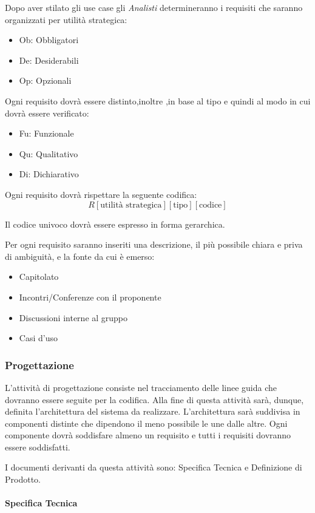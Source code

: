 Dopo aver stilato gli use case gli  \emph{Analisti}  determineranno i
requisiti che saranno organizzati per utilità strategica:
\begin{itemize}
\item Ob: Obbligatori
\item De: Desiderabili
\item Op: Opzionali
\end{itemize}
Ogni requisito dovrà essere distinto,inoltre ,in base al tipo e quindi al modo in cui dovrà essere verificato:
\begin{itemize}
\item Fu: Funzionale
\item Qu: Qualitativo
\item Di: Dichiarativo
\end{itemize}
Ogni requisito dovrà rispettare la seguente codifica:
$$ R[\text{utilità strategica}][\text{tipo}][\text{codice}] $$

Il codice univoco dovrà essere espresso in forma gerarchica.

Per ogni requisito saranno inseriti una descrizione, il più possibile
chiara e priva di ambiguità, e la fonte da cui è emerso: 
\begin{itemize}
\item Capitolato
\item Incontri/Conferenze con il proponente
\item Discussioni interne al gruppo
\item Casi d'uso
\end{itemize}



\subsubsection{Progettazione}

L'attività di progettazione consiste nel tracciamento delle linee
guida che dovranno essere seguite per la codifica. Alla fine di questa
attività sarà, dunque, definita l'architettura del sistema da
realizzare. L'architettura sarà suddivisa in componenti distinte che
dipendono il meno possibile le une dalle altre. Ogni componente dovrà
soddisfare almeno un requisito e tutti i requisiti dovranno essere
soddisfatti. 

I documenti derivanti da questa attività sono: Specifica Tecnica e Definizione di Prodotto.

\paragraph{Specifica Tecnica}

